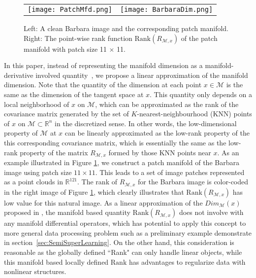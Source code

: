 \documentclass[letterpaper,10pt]{article}
\def\M{\mathcal{M}}
\def\RR{\mathbb{R}}
\def\Rank{\mathrm{Rank}}
\begin{document}
\begin{figure}[t]
\centering
\begin{tabular}{cc}
\texttt{[image: PatchMfd.png]} &
\texttt{[image: BarbaraDim.png]} \\
\end{tabular}
\caption{Left: A clean Barbara image and the corresponding patch manifold. Right: The point-wise rank function $\Rank(R_{\mathcal{M},x})$ of the patch manifold with patch size 11 $\times$ 11.}
\label{fig:Patch Manifold}
\end{figure}

In this paper, instead of representing the manifold dimension as a manifold-derivative involved quantity~\cite{osher2016low}, we propose a linear approximation of the manifold dimension. Note that the quantity of the dimension at each point $x\in\mathcal{M}$ is the same as the dimension of the tangent space at $x$. This quantity only depends on a local neighborhood of $x$ on $\mathcal{M}$, which can be approximated as the rank of the covariance matrix generated by the set of $K$-nearest-neighbourhood (KNN) points of $x$ on $\M\subset\RR^n$ in the discretized sense. In other words, the low-dimensional property of $\M$ at $x$ can be linearly approximated as the low-rank property of the this corresponding covariance matrix, which is essentially the same as the low-rank property of the matrix $R_{\mathcal{M},x}$ formed by those KNN points near $x$.
As an example illustrated in Figure \ref{fig:Patch Manifold}, we construct a patch manifold of the Barbara image using patch size $11 \times 11$. This leads to a set of image patches represented as a point clouds in $\RR^{121}$. The rank of $R_{\mathcal{M},x}$ for the Barbara image is color-coded in the right image of Figure \ref{fig:Patch Manifold}, which clearly illustrates that $\Rank(R_{\mathcal{M},x})$ has low value for this natural image.
As a linear approximation of the $Dim_{\mathcal{M}}(x)$ proposed in \cite{osher2016low}, the manifold based quantity $\Rank(R_{\mathcal{M},x})$ does not involve with any manifold differential operators, which has potential to apply this concept to more general data processing problem such as a preliminary example demonstrate in section~\ref{sec:SemiSuperLearning}. On the other hand, this consideration is reasonable as the globally defined ``Rank" can only handle linear objects, while this manifold based locally defined $\Rank$ has advantages to regularize data with nonlinear structures.
\end{document}

